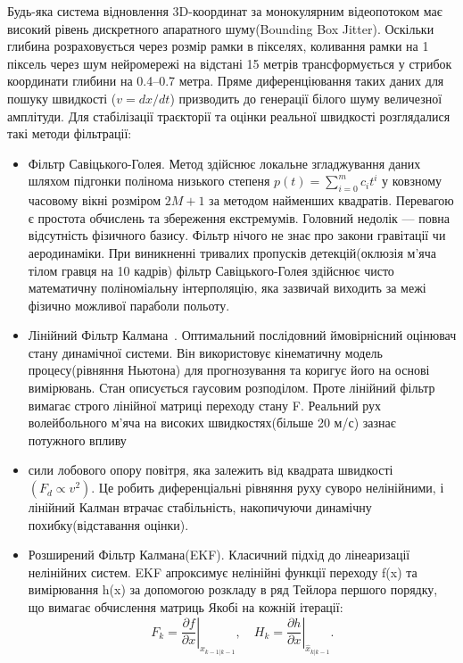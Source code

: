 Будь-яка система відновлення 3D-координат за монокулярним
відеопотоком має високий рівень дискретного апаратного шуму(Bounding Box Jitter). Оскільки глибина розраховується
через розмір рамки в пікселях, коливання рамки на 1 піксель через шум нейромережі на відстані 15 метрів
трансформується у стрибок координати глибини на 0.4–0.7 метра. Пряме
диференціювання таких даних для пошуку швидкості ($v = dx/dt$) призводить
до генерації білого шуму величезної амплітуди.
Для стабілізації траєкторії та оцінки реальної швидкості розглядалися
такі методи фільтрації:

\begin{itemize}
    \item Фільтр Савіцького-Голея. Метод здійснює локальне згладжування
    даних шляхом підгонки полінома низького степеня $p(t) = \sum_{i=0}^m c_i t^i$
    у ковзному часовому вікні розміром $2M+1$ за методом найменших квадратів.
    Перевагою є простота обчислень та збереження екстремумів. Головний
    недолік — повна відсутність фізичного базису. Фільтр нічого не знає про
    закони гравітації чи аеродинаміки. При виникненні тривалих пропусків
    детекцій(оклюзія м'яча тілом гравця на 10 кадрів) фільтр Савіцького-Голея
    здійснює чисто математичну поліноміальну інтерполяцію, яка зазвичай
    виходить за межі фізично можливої параболи польоту.
    \item Лінійний Фільтр Калмана~\cite{kalman1960,babb_kalman_pictures}. Оптимальний
    послідовний ймовірнісний оцінювач стану динамічної системи. Він
    використовує кінематичну модель процесу(рівняння Ньютона) для
    прогнозування та коригує його на основі вимірювань. Стан описується
    гаусовим розподілом. Проте лінійний фільтр вимагає строго лінійної матриці
    переходу стану F. Реальний рух волейбольного м'яча на високих швидкостях(більше 20 м/с) зазнає потужного впливу
    \item сили лобового опору повітря, яка
    залежить від квадрата швидкості $(F_d \propto v^2)$. Це робить
    диференціальні рівняння руху суворо нелінійними, і лінійний Калман втрачає
    стабільність, накопичуючи динамічну похибку(відставання оцінки).
    \item Розширений Фільтр Калмана(\gls{EKF}).
    Класичний підхід до лінеаризації нелінійних систем. \gls{EKF} апроксимує
    нелінійні функції переходу f(x) та вимірювання h(x) за допомогою розкладу в
    ряд Тейлора першого порядку, що вимагає обчислення матриць Якобі на кожній ітерації:
    \begin{equation}F_k = \left. \frac{\partial f}{\partial x} \right|_{\hat{x}_{k-1|k-1}}, \quad H_k = \left. \frac{\partial h}{\partial x} \right|_{\hat{x}_{k|k-1}}. \end{equation}

\end{itemize}
